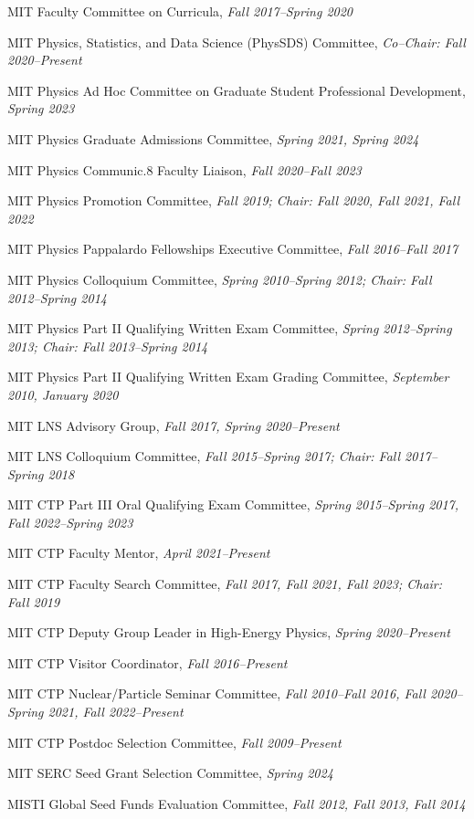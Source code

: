 \bbl
\item MIT Faculty Committee on Curricula, \emph{Fall 2017--Spring 2020}
\item MIT Physics, Statistics, and Data Science (PhysSDS) Committee, \emph{Co--Chair: Fall 2020--Present}
\item MIT Physics Ad Hoc Committee on Graduate Student Professional Development, \emph{Spring 2023}
\item MIT Physics Graduate Admissions Committee, \emph{Spring 2021, Spring 2024}
\item MIT Physics Communic.8 Faculty Liaison, \emph{Fall 2020--Fall 2023}
\item MIT Physics Promotion Committee, \emph{Fall 2019; Chair: Fall 2020, Fall 2021, Fall 2022}
\item MIT Physics Pappalardo Fellowships Executive Committee, \emph{Fall 2016--Fall 2017}
\item MIT Physics Colloquium Committee, \emph{Spring 2010--Spring 2012; Chair: Fall 2012--Spring 2014}
\item MIT Physics Part II Qualifying Written Exam Committee, \emph{Spring 2012--Spring 2013; Chair: Fall 2013--Spring 2014}
\item MIT Physics Part II Qualifying Written Exam Grading Committee, \emph{September 2010, January 2020}
\item MIT LNS Advisory Group, \emph{Fall 2017, Spring 2020--Present}
\item MIT LNS Colloquium Committee, \emph{Fall 2015--Spring 2017; Chair: Fall 2017--Spring 2018}
\item MIT CTP Part III Oral Qualifying Exam Committee, \emph{Spring 2015--Spring 2017, Fall 2022--Spring 2023}
\item MIT CTP Faculty Mentor, \emph{April 2021--Present}
\item MIT CTP Faculty Search Committee, \emph{Fall 2017, Fall 2021, Fall 2023; Chair: Fall 2019}
\item MIT CTP Deputy Group Leader in High-Energy Physics, \emph{Spring 2020--Present}
\item MIT CTP Visitor Coordinator, \emph{Fall 2016--Present}
\item MIT CTP Nuclear/Particle Seminar Committee, \emph{Fall 2010--Fall 2016, Fall 2020--Spring 2021, Fall 2022--Present}
\item MIT CTP Postdoc Selection Committee, \emph{Fall 2009--Present}
\item MIT SERC Seed Grant Selection Committee, \emph{Spring 2024}
\item MISTI Global Seed Funds Evaluation Committee, \emph{Fall 2012, Fall 2013, Fall 2014}
\el
